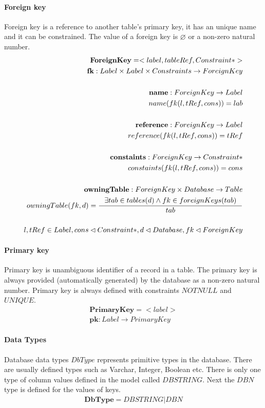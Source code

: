 \documentclass[11pt]{article}
\begin{document}
\paragraph{Foreign key} Foreign key is a reference to another table's primary key, it has an unique name and it can be constrained. The value of a foreign key is $\varnothing$ or a non-zero natural number.
\begin{align*}
	\mathbf{ForeignKey} = <label, tableRef, Constraint*> \\ 
	\mathbf{fk} : Label \times Label \times Constraints \rightarrow ForeignKey \\ \\
	\mathbf{name} : ForeignKey \rightarrow Label \\
	name(fk(l, tRef, cons)) = lab  \\ \\
	\mathbf{reference} : ForeignKey \rightarrow Label  \\
	reference(fk(l, tRef, cons)) = tRef  \\ \\
	\mathbf{constaints} : ForeignKey \rightarrow Constraint*  \\
	constaints(fk(l, tRef, cons)) = cons  \\ \\
	\mathbf{owningTable} : ForeignKey \times Database \rightarrow Table  \\
	owningTable(fk, d) = \inference{\exists tab \in tables(d) \wedge fk \in foreignKeys(tab)}{tab}\\\\
	l, tRef \in Label, cons \lhd Constraint*,d \lhd Database, fk \lhd ForeignKey
\end{align*}


\paragraph{Primary key} Primary key is unambiguous identifier of a record in a table. The primary key is always provided (automatically generated) by the database as a non-zero natural number. Primary key is always defined with constraints $NOTNULL$ and $UNIQUE$. 
\begin{align*}
	\mathbf{PrimaryKey} =  < label > 	\\
	\mathbf{pk} : Label \rightarrow PrimaryKey
\end{align*}

\paragraph{Data Types} Database data types $DbType$ represents primitive types in the database. There are usually defined types such as Varchar, Integer, Boolean etc. There is only one type of column values defined in the model called $DBSTRING$. Next the $DBN$ type is defined for the values of keys.
\begin{align*}
	\mathbf{DbType} = DBSTRING | DBN
\end{align*}
\end{document}
